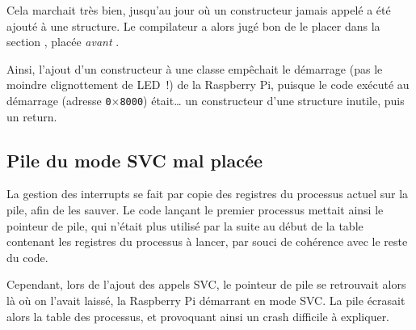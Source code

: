 \documentclass[11pt,a4paper]{article}
\newcommand{\hex}[1]{\texttt{0$\times$#1}}
\begin{document}
Cela marchait très bien, jusqu'au jour où un constructeur jamais appelé a été
ajouté à une structure. Le compilateur a alors jugé bon de le placer dans
la section , placée \emph{avant} .

Ainsi, l'ajout d'un constructeur à une classe empêchait le démarrage
(pas le moindre clignottement de LED~!) de la Raspberry Pi, puisque le code
exécuté au démarrage (adresse \hex{8000}) était\ldots{} un constructeur d'une
structure inutile, puis un return.

\subsection*{Pile du mode SVC mal placée}
La gestion des interrupts se fait par copie des registres du processus
actuel sur la pile, afin de les sauver. Le code lançant le premier
processus mettait ainsi le pointeur de pile, qui n'était plus utilisé
par la suite au début de la table contenant les registres du processus
à lancer, par souci de cohérence avec le reste du code.

Cependant, lors de l'ajout des appels SVC, le pointeur de pile se
retrouvait alors là où on l'avait laissé, la Raspberry Pi démarrant en
mode SVC\@. La pile écrasait alors la table des processus, et provoquant
ainsi un crash difficile à expliquer.
\end{document}
